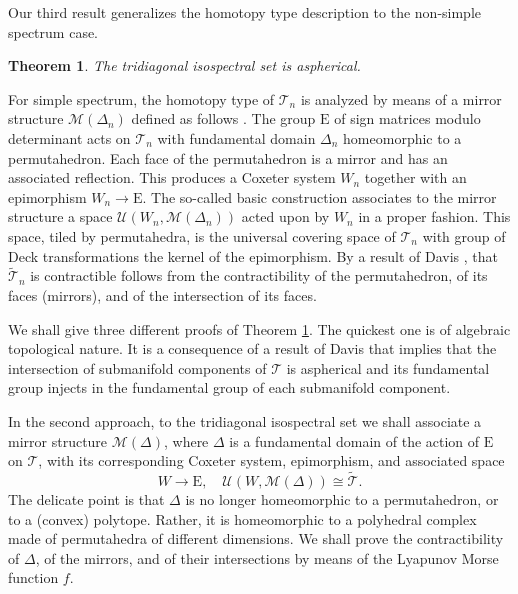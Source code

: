 \documentclass[reqno]{amsart}
\newcommand{\cM}{\mathcal{M}}
\newcommand{\cT}{\mathcal{T}}
\newcommand{\cU}{\mathcal{U}}
\newcommand{\E}{\mathrm{E}}
\newtheorem{theorem}{Theorem}[section]
\begin{document}

Our third result generalizes the homotopy type description to the non-simple spectrum case.

\begin{theorem}\label{thm:aspherical} The tridiagonal isospectral set  is aspherical.
\end{theorem}

For simple spectrum, the homotopy type of $\cT_n$ is analyzed by means of a  mirror structure $\mathcal{M}(\Delta_n)$ defined as follows \cite{To,Da2}. The group $\E$ of sign matrices modulo determinant acts on $\cT_n$ with fundamental domain $\Delta_n$ homeomorphic to a permutahedron. Each face of the permutahedron is a mirror and has an associated reflection. This produces a Coxeter system $W_n$ together with an epimorphism $W_n\to \E$. The so-called basic construction associates to the mirror structure a space
$\cU(W_n,\cM(\Delta_n))$ acted upon by $W_n$ in a proper fashion. This space, tiled by permutahedra, is the universal covering space of $\cT_n$ with group of Deck transformations
the kernel of the epimorphism. By a result of Davis \cite{Da1}, that $\widetilde{\cT}_n$ is contractible follows from the contractibility of the permutahedron, of its faces (mirrors), and of the intersection of its faces.

We shall give three different proofs of Theorem \ref{thm:aspherical}. The quickest one is of algebraic topological nature. It is a consequence of a result of Davis \cite{Da2} that implies that the intersection of submanifold components of $\cT$ is aspherical and its fundamental group injects in the fundamental group of each submanifold component.

In the second approach,
to the tridiagonal isospectral set we shall associate a mirror structure $\cM(\Delta)$, where $\Delta$ is a fundamental domain of the action of $\E$ on $\cT$, with its corresponding Coxeter system, epimorphism, and associated space
\[W\to \E,\quad \cU(W,\cM(\Delta))\cong \widetilde{\cT}.\]
The delicate point is that $\Delta$ is no longer homeomorphic to a permutahedron, or to a (convex) polytope. Rather, it is homeomorphic to a polyhedral complex made of permutahedra of different dimensions. We shall prove the contractibility of $\Delta$, of the mirrors, and of their intersections by means of the  Lyapunov Morse function $f$.
\end{document}
